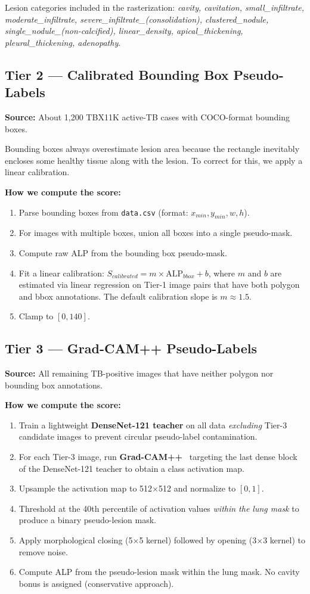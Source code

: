 \documentclass[12pt]{report}
\begin{document}
Lesion categories included in the rasterization: \textit{cavity, cavitation, small\_infiltrate, moderate\_infiltrate, severe\_infiltrate\_(consolidation), clustered\_nodule, single\_nodule\_(non-calcified), linear\_density, apical\_thickening, pleural\_thickening, adenopathy}.

\subsection{Tier 2 --- Calibrated Bounding Box Pseudo-Labels}
\textbf{Source:} About 1,200 TBX11K active-TB cases with COCO-format bounding boxes.

Bounding boxes always overestimate lesion area because the rectangle inevitably encloses some healthy tissue along with the lesion. To correct for this, we apply a linear calibration.

\textbf{How we compute the score:}
\begin{enumerate}
    \item Parse bounding boxes from \texttt{data.csv} (format: $x_{min}, y_{min}, w, h$).
    \item For images with multiple boxes, union all boxes into a single pseudo-mask.
    \item Compute raw ALP from the bounding box pseudo-mask.
    \item Fit a linear calibration: $S_{calibrated} = m \times \text{ALP}_{bbox} + b$, where $m$ and $b$ are estimated via linear regression on Tier-1 image pairs that have both polygon and bbox annotations. The default calibration slope is $m \approx 1.5$.
    \item Clamp to $[0, 140]$.
\end{enumerate}

\subsection{Tier 3 --- Grad-CAM++ Pseudo-Labels}
\textbf{Source:} All remaining TB-positive images that have neither polygon nor bounding box annotations.

\textbf{How we compute the score:}
\begin{enumerate}
    \item Train a lightweight \textbf{DenseNet-121 teacher} on all data \textit{excluding} Tier-3 candidate images to prevent circular pseudo-label contamination.
    \item For each Tier-3 image, run \textbf{Grad-CAM++}~\cite{ref13} targeting the last dense block of the DenseNet-121 teacher to obtain a class activation map.
    \item Upsample the activation map to 512$\times$512 and normalize to $[0,1]$.
    \item Threshold at the 40th percentile of activation values \textit{within the lung mask} to produce a binary pseudo-lesion mask.
    \item Apply morphological closing (5$\times$5 kernel) followed by opening (3$\times$3 kernel) to remove noise.
    \item Compute ALP from the pseudo-lesion mask within the lung mask. No cavity bonus is assigned (conservative approach).
\end{enumerate}
\end{document}
